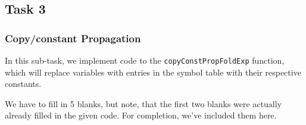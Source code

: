 \documentclass[a4paper]{article}
\begin{document}
\subsection{Task 3}

\subsubsection{Copy/constant Propagation}

In this sub-task, we implement code to the \verb|copyConstPropFoldExp| function, which will replace variables with entries in the symbol table with their respective constants.

We have to fill in 5 blanks, but note, that the first two blanks were actually already filled in the given code. For completion, we've included them here.
\end{document}
